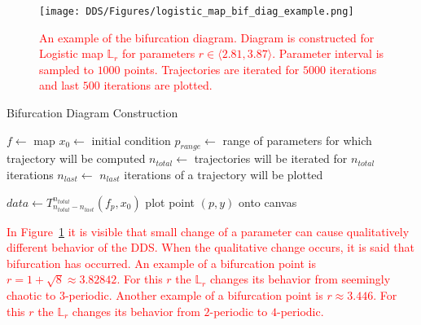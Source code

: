 \begin{figure}[!h]
    \centering
    \texttt{[image: DDS/Figures/logistic\_map\_bif\_diag\_example.png]}
    \caption{
        \textcolor{red}{
        An example of the bifurcation diagram. 
        Diagram is constructed for Logistic map $\mathbb{L}_{r}$ for parameters $r \in \langle 2.81, 3.87 \rangle$. 
        Parameter interval is sampled to $1000$ points. 
        Trajectories are iterated for $5000$ iterations and last $500$ iterations are plotted.
        }
    }
    \label{fig:bif_diag_example}
\end{figure}

\begin{algorithm}
\caption{Bifurcation Diagram Construction}\label{bif_diag_alg}
\begin{algorithmic}[1]
\Statex $f \gets$ map
\Statex $x_0 \gets$ initial condition
\Statex $p_{range} \gets$ range of parameters for which trajectory will be computed
\Statex $n_{total} \gets$ trajectories will be iterated for $n_{total}$ iterations
\Statex $n_{last} \gets$ $n_{last}$ iterations of a trajectory will be plotted

    \State $data \leftarrow T_{n_{total}-n_{last}}^{n_{total}}(f_p, x_0)$
        \State plot point $(p, y)$ onto canvas
    \EndFor
\EndFor

\end{algorithmic}
\end{algorithm}

\begin{remark}
    \textcolor{red}{
    In Figure~\ref{fig:bif_diag_example} it is visible that small change of a parameter can cause qualitatively different behavior of the DDS.
    When the qualitative change occurs, it is said that bifurcation has occurred.
    An example of a bifurcation point is $r = 1+\sqrt{8} \approx 3.82842$. For this $r$ the $\mathbb{L}_{r}$ changes its behavior from seemingly chaotic to $3$-periodic. 
    Another example of a bifurcation point is $r \approx 3.446$. For this $r$ the $\mathbb{L}_{r}$ changes its behavior from $2$-periodic to $4$-periodic.
    }
\end{remark}